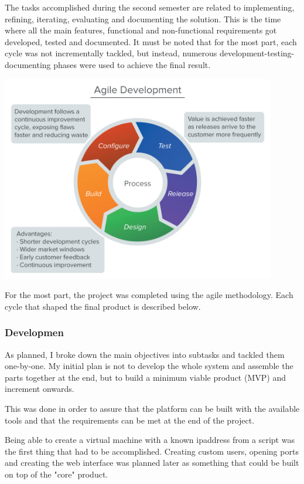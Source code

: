 \documentclass{article}
\begin{document}
The tasks accomplished during the second semester are related to implementing, refining, iterating, evaluating and documenting the solution. This is the time where all the main features, functional and non-functional requirements got developed, tested and documented. It must be noted that for the most part, each cycle was not incrementally tackled, but instead, numerous development-testing-documenting phases were used to achieve the final result.
\begin{center}
    \includegraphics[width=12cm]{agile.jpg}
\end{center}

For the most part, the project was completed using the agile methodology. Each cycle that shaped the final product is described below.
\subsubsection{Developmen}
As planned, I broke down the main objectives into subtasks and tackled them one-by-one. My initial plan is not to develop the whole system and assemble the parts together at the end, but to build a minimum viable product (MVP) and increment onwards.

This was done in order to assure that the platform can be built with the available tools and that the requirements can be met at the end of the project.

Being able to create a virtual machine with a known \gls{ipaddress} from a script was the first thing that had to be accomplished. Creating custom users, opening ports and creating the web interface was planned later as something that could be built on top of the "core" product.
\end{document}
